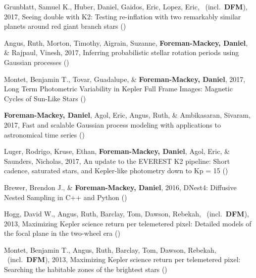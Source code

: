\item[{\color{numcolor}\scriptsize8}] Grunblatt, Samuel K., Huber, Daniel, Gaidos, Eric, Lopez, Eric, \etal\ (incl.\ \textbf{DFM}), 2017, Seeing double with K2: Testing re-inflation with two remarkably similar planets around red giant branch stars ()

\item[{\color{numcolor}\scriptsize7}] Angus, Ruth, Morton, Timothy, Aigrain, Suzanne, \textbf{Foreman-Mackey, Daniel}, \& Rajpaul, Vinesh, 2017, Inferring probabilistic stellar rotation periods using Gaussian processes ()

\item[{\color{numcolor}\scriptsize6}] Montet, Benjamin T., Tovar, Guadalupe, \& \textbf{Foreman-Mackey, Daniel}, 2017, Long Term Photometric Variability in Kepler Full Frame Images: Magnetic Cycles of Sun-Like Stars ()

\item[{\color{numcolor}\scriptsize5}] \textbf{Foreman-Mackey, Daniel}, Agol, Eric, Angus, Ruth, \& Ambikasaran, Sivaram, 2017, Fast and scalable Gaussian process modeling with applications to astronomical time series ()

\item[{\color{numcolor}\scriptsize4}] Luger, Rodrigo, Kruse, Ethan, \textbf{Foreman-Mackey, Daniel}, Agol, Eric, \& Saunders, Nicholas, 2017, An update to the EVEREST K2 pipeline: Short cadence, saturated stars, and Kepler-like photometry down to Kp = 15 ()

\item[{\color{numcolor}\scriptsize3}] Brewer, Brendon J., \& \textbf{Foreman-Mackey, Daniel}, 2016, DNest4: Diffusive Nested Sampling in C++ and Python ()

\item[{\color{numcolor}\scriptsize2}] Hogg, David W., Angus, Ruth, Barclay, Tom, Dawson, Rebekah, \etal\ (incl.\ \textbf{DFM}), 2013, Maximizing Kepler science return per telemetered pixel: Detailed models of the focal plane in the two-wheel era ()

\item[{\color{numcolor}\scriptsize1}] Montet, Benjamin T., Angus, Ruth, Barclay, Tom, Dawson, Rebekah, \etal\ (incl.\ \textbf{DFM}), 2013, Maximizing Kepler science return per telemetered pixel: Searching the habitable zones of the brightest stars ()